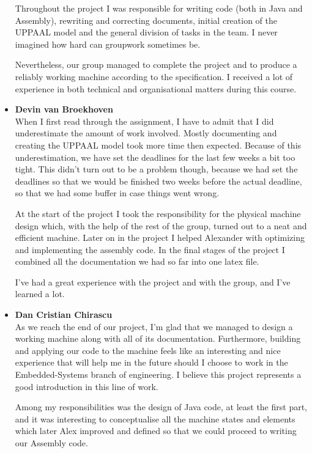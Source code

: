 \documentclass[a4paper,oneside,11pt]{report}
\begin{document}
\begin{itemize}
Throughout the project I was responsible for writing code (both in Java and Assembly), rewriting and correcting documents, initial creation of the UPPAAL model and the general division of tasks in the team. I never imagined how hard can groupwork sometimes be.

Nevertheless, our group managed to complete the project and to produce a reliably working machine according to the specification. I received a lot of experience in both technical and organisational matters during this course.

\item \textbf{Devin van Broekhoven}\\
When I first read through the assignment, I have to admit that I did underestimate the amount of work involved. Mostly documenting and creating the UPPAAL model took more time then expected. Because of this underestimation, we have set the deadlines for the last few weeks a bit too tight. This didn't turn out to be a problem though, because we had set the deadlines so that we would be finished two weeks before the actual deadline, so that we had some buffer in case things went wrong.

At the start of the project I took the responsibility for the physical machine design which, with the help of the rest of the group, turned out to a neat and efficient machine. Later on in the project I helped Alexander with optimizing and implementing the assembly code. In the final stages of the project I combined all the documentation we had so far into one latex file.

I've had a great experience with the project and with the group, and I've learned a lot.

\item \textbf{Dan Cristian Chirascu}\\
As we reach the end of our project, I'm glad that we managed to design a working machine along with all of its documentation. Furthermore, building and applying our code to the machine feels like an interesting and nice experience that will help me in the future should I choose to work in the Embedded-Systems branch of engineering. I believe this project represents a good introduction in this line of work.

Among my responsibilities was the design of Java code, at least the first part, and it was interesting to conceptualise all the machine states and elements which later Alex improved and defined so that we could proceed to writing our Assembly code.


\end{itemize}
\end{document}
